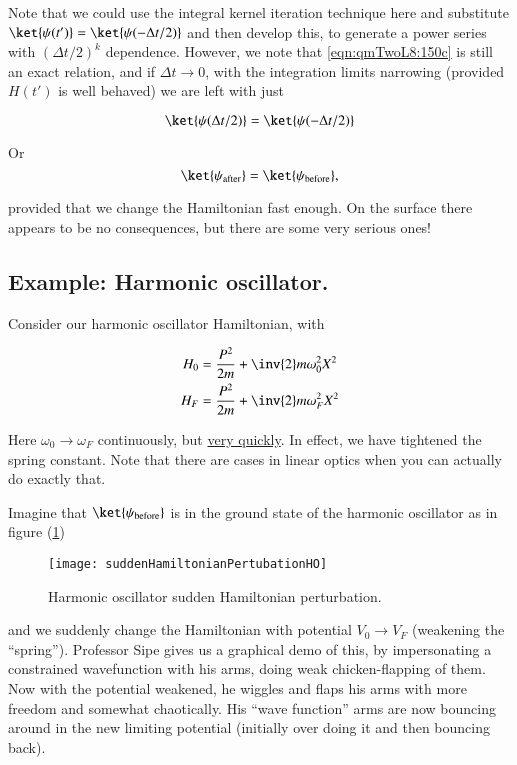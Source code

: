 Note that we could use the integral kernel iteration technique here and substitute $\ket{\psi(t')} = \ket{\psi(-\Delta t/2)}$ and then develop this, to generate a power series with $(\Delta t/2)^k$ dependence.  However, we note that \ref{eqn:qmTwoL8:150c} is still an exact relation, and if $\Delta t \rightarrow 0$, with the integration limits narrowing (provided $H(t')$ is well behaved) we are left with just

\begin{equation}\label{eqn:qmTwoL8:180}
\ket{\psi(\Delta t/2)} = \ket{\psi(-\Delta t/2)}
\end{equation}

Or
\begin{equation}\label{eqn:qmTwoL8:200}
\ket{\psi_{\text{after}}} = \ket{\psi_{\text{before}}},
\end{equation}

provided that we change the Hamiltonian fast enough.  On the surface there appears to be no consequences, but there are some very serious ones!

\subsection{Example: Harmonic oscillator.}

Consider our harmonic oscillator Hamiltonian, with

\begin{align}\label{eqn:qmTwoL8:220}
H_0 &= \frac{P^2}{2m} + \inv{2} m \omega_0^2 X^2 \\
H_F &= \frac{P^2}{2m} + \inv{2} m \omega_F^2 X^2
\end{align}

Here $\omega_0 \rightarrow \omega_F$ continuously, but \underline{very quickly}.  In effect, we have tightened the spring constant.  Note that there are cases in linear optics when you can actually do exactly that.

Imagine that $\ket{\psi_{\text{before}}}$ is in the ground state of the harmonic oscillator as in figure (\ref{fig:suddenHamiltonianPertubationHO})

\begin{figure}[htp]
\centering
\texttt{[image: suddenHamiltonianPertubationHO]}
\caption{Harmonic oscillator sudden Hamiltonian perturbation.}\label{fig:suddenHamiltonianPertubationHO}
\end{figure}

and we suddenly change the Hamiltonian with potential $V_0 \rightarrow V_F$ (weakening the ``spring'').  Professor Sipe gives us a graphical demo of this, by impersonating a constrained wavefunction with his arms, doing weak chicken-flapping of them.  Now with the potential weakened, he wiggles and flaps his arms with more freedom and somewhat chaotically.  His ``wave function'' arms are now bouncing around in the new limiting potential (initially over doing it and then bouncing back).

